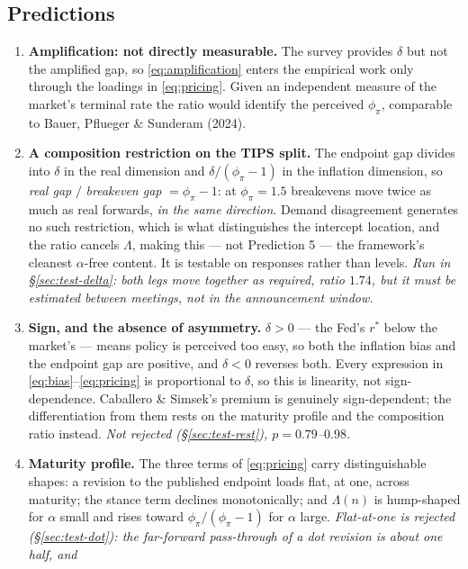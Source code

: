 \documentclass[11pt]{article}
\begin{document}
\subsection{Predictions}
\label{sec:predictions}
\begin{enumerate}\setlength\itemsep{0.15em}
\item \textbf{Amplification: not directly measurable.} The survey provides $\delta$ but not the
amplified gap, so \eqref{eq:amplification} enters the empirical work only through the loadings
in \eqref{eq:pricing}. Given an independent measure of the market's terminal rate the ratio
would identify the perceived $\phi_\pi$, comparable to Bauer, Pflueger \& Sunderam (2024).
\item \textbf{A composition restriction on the TIPS split.} The endpoint gap divides into
$\delta$ in the real dimension and $\delta/(\phi_\pi-1)$ in the inflation dimension, so
\emph{real gap} $/$ \emph{breakeven gap} $=\phi_\pi-1$: at $\phi_\pi=1.5$ breakevens move twice
as much as real forwards, \emph{in the same direction}. Demand disagreement generates no such
restriction, which is what distinguishes the intercept location, and the ratio cancels
$\Lambda$, making this --- not Prediction 5 --- the framework's cleanest $\alpha$-free content.
It is testable on responses rather than levels. \emph{Run in \S\ref{sec:test-delta}: both legs
move together as required, ratio $1.74$, but it must be estimated between meetings, not in the
announcement window.}
\item \textbf{Sign, and the absence of asymmetry.} $\delta>0$ --- the Fed's $r^{*}$ below the
market's --- means policy is perceived too easy, so both the inflation bias and the endpoint gap
are positive, and $\delta<0$ reverses both. Every expression in
\eqref{eq:bias}--\eqref{eq:pricing} is proportional to $\delta$, so this is linearity, not
sign-dependence. Caballero \& Simsek's premium is genuinely sign-dependent; the differentiation
from them rests on the maturity profile and the composition ratio instead. \emph{Not rejected
(\S\ref{sec:test-rest}), $p=0.79$--$0.98$.}
\item \textbf{Maturity profile.} The three terms of \eqref{eq:pricing} carry distinguishable
shapes: a revision to the published endpoint loads flat, at one, across maturity; the stance
term declines monotonically; and $\Lambda(n)$ is hump-shaped for $\alpha$ small and rises toward
$\phi_\pi/(\phi_\pi-1)$ for $\alpha$ large. \emph{Flat-at-one is rejected
(\S\ref{sec:test-dot}): the far-forward pass-through of a dot revision is about one half, and
}
\end{enumerate}
\end{document}
